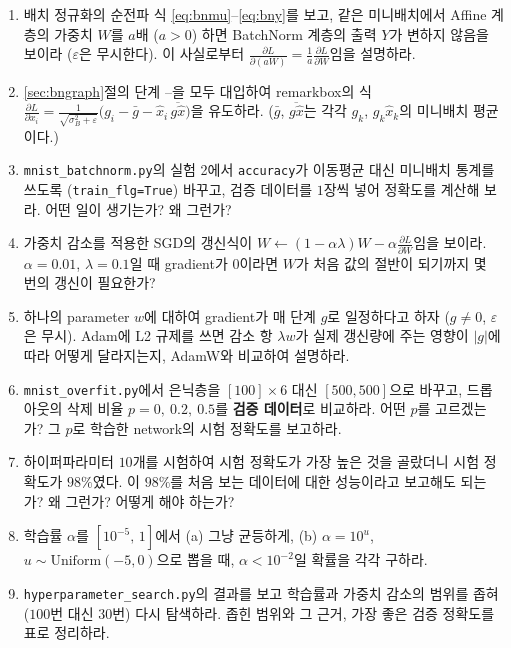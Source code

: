 \documentclass[11pt,a4paper]{article}
\newcommand{\pd}[2]{\frac{\partial #1}{\partial #2}}
\begin{document}
\begin{enumerate}[label=\arabic*.]
\item 배치 정규화의 순전파 식 \eqref{eq:bnmu}--\eqref{eq:bny}를 보고,
같은 미니배치에서 Affine 계층의 가중치 $W$를 $a$배 ($a>0$) 하면 BatchNorm 계층의 출력 $Y$가 변하지 않음을 보이라
($\varepsilon$은 무시한다). 이 사실로부터 $\pd{L}{(aW)}=\frac1a\pd{L}{W}$임을 설명하라.

\item \ref{sec:bngraph}절의 단계 --을 모두 대입하여
remarkbox의 식 $\pd{L}{x_i}=\frac{1}{\sqrt{\sigma_B^2+\varepsilon}}\bigl(g_i-\bar g-\hat x_i\,\overline{g\hat x}\bigr)$을 유도하라.
($\bar g$, $\overline{g\hat x}$는 각각 $g_k$, $g_k\hat x_k$의 미니배치 평균이다.)

\item \texttt{mnist\_batchnorm.py}의 실험 2에서 \texttt{accuracy}가 이동평균 대신 미니배치 통계를 쓰도록
(\texttt{train\_flg=True}) 바꾸고, 검증 데이터를 $1$장씩 넣어 정확도를 계산해 보라.
어떤 일이 생기는가? 왜 그런가?

\item 가중치 감소를 적용한 SGD의 갱신식이 $W\leftarrow(1-\alpha\lambda)W-\alpha\pd{L}{W}$임을 보이라.
$\alpha=0.01$, $\lambda=0.1$일 때 gradient가 $0$이라면 $W$가 처음 값의 절반이 되기까지 몇 번의 갱신이 필요한가?

\item 하나의 parameter $w$에 대하여 gradient가 매 단계 $g$로 일정하다고 하자 ($g\neq0$, $\varepsilon$은 무시).
Adam에 L2 규제를 쓰면 감소 항 $\lambda w$가 실제 갱신량에 주는 영향이 $|g|$에 따라 어떻게 달라지는지,
AdamW와 비교하여 설명하라.



\item \texttt{mnist\_overfit.py}에서 은닉층을 $[100]\times6$ 대신 $[500, 500]$으로 바꾸고,
드롭아웃의 삭제 비율 $p=0,\ 0.2,\ 0.5$를 \textbf{검증 데이터}로 비교하라.
어떤 $p$를 고르겠는가? 그 $p$로 학습한 network의 시험 정확도를 보고하라.

\item 하이퍼파라미터 $10$개를 시험하여 시험 정확도가 가장 높은 것을 골랐더니 시험 정확도가 $98\%$였다.
이 $98\%$를 처음 보는 데이터에 대한 성능이라고 보고해도 되는가? 왜 그런가? 어떻게 해야 하는가?

\item 학습률 $\alpha$를 $[10^{-5},\,1]$에서 (a) 그냥 균등하게, (b) $\alpha=10^{u}$, $u\sim\mathrm{Uniform}(-5,0)$으로 뽑을 때,
$\alpha<10^{-2}$일 확률을 각각 구하라.

\item \texttt{hyperparameter\_search.py}의 결과를 보고 학습률과 가중치 감소의 범위를 좁혀
($100$번 대신 $30$번) 다시 탐색하라. 좁힌 범위와 그 근거, 가장 좋은 검증 정확도를 표로 정리하라.

\end{enumerate}

\end{document}
